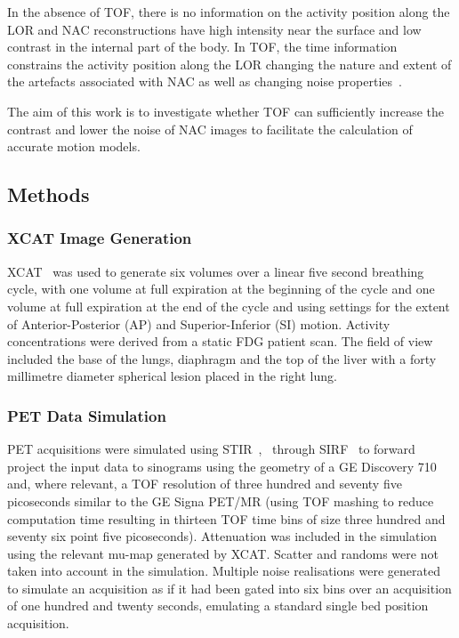         In the absence of \gls{TOF}, there is no information on the activity position along the \gls{LOR} and \gls{NAC} reconstructions have high intensity near the surface and low contrast in the internal part of the body. In \gls{TOF}, the time information constrains the activity position along the \gls{LOR} changing the nature and extent of the artefacts associated with \gls{NAC} as well as changing noise properties~\cite{Ter-Pogossian1981}.
        
        The aim of this work is to investigate whether \gls{TOF} can sufficiently increase the contrast and lower the noise of \gls{NAC} images to facilitate the calculation of accurate motion models.
        
        \subsection{Methods} \label{impact_of_tof_on_respiratory_motion_modelling_using_nac_pet_methods}
            \subsubsection{XCAT Image Generation} \label{impact_of_tof_on_respiratory_motion_modelling_using_nac_pet_methods_xcat_image_generation}
                \gls{XCAT}~ was used to generate six volumes over a linear five second breathing cycle, with one volume at full expiration at the beginning of the cycle and one volume at full expiration at the end of the cycle and using settings for the extent of Anterior-Posterior (AP) and Superior-Inferior (SI) motion. Activity concentrations were derived from a static \gls{FDG} patient scan. The field of view included the base of the lungs, diaphragm and the top of the liver with a forty millimetre diameter spherical lesion placed in the right lung.
            
            \subsubsection{PET Data Simulation} \label{impact_of_tof_on_respiratory_motion_modelling_using_nac_pet_methods_pet_data_simulation}
                \gls{PET} acquisitions were simulated using \gls{STIR}~,~ through \gls{SIRF}~ to forward project the input data to sinograms using the geometry of a GE Discovery 710 and, where relevant, a \gls{TOF} resolution of three hundred and seventy five picoseconds similar to the GE Signa \gls{PET}/\gls{MR} (using \gls{TOF} mashing to reduce computation time resulting in thirteen \gls{TOF} time bins of size three hundred and seventy six point five picoseconds). Attenuation was included in the simulation using the relevant \gls{mu-map} generated by \gls{XCAT}. Scatter and randoms were not taken into account in the simulation. Multiple noise realisations were generated to simulate an acquisition as if it had been gated into six bins over an acquisition of one hundred and twenty seconds, emulating a standard single bed position acquisition. 
            

